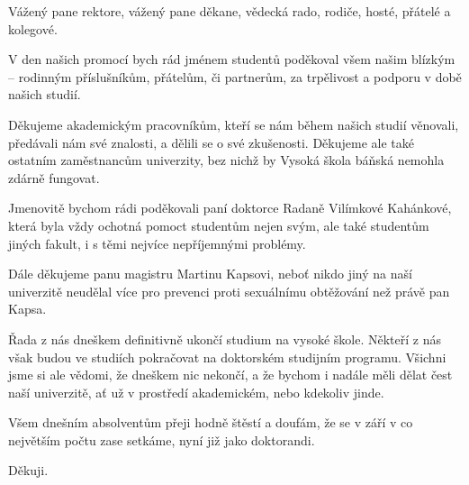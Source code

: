 \documentclass[14pt]{article}
\begin{document}
Vážený pane rektore, vážený pane děkane, vědecká rado, rodiče, hosté, přátelé a kolegové.

V den našich promocí bych rád jménem studentů poděkoval všem našim blízkým -- rodinným
příslušníkům, přátelům, či partnerům, za trpělivost a podporu v době našich studií.

Děkujeme akademickým pracovníkům, kteří se nám během našich studií věnovali, předávali nám své
znalosti, a dělili se o své zkušenosti. Děkujeme ale také ostatním zaměstnancům univerzity, bez
nichž by Vysoká škola báňská nemohla zdárně fungovat.

Jmenovitě bychom rádi poděkovali paní doktorce Radaně Vilímkové Kahánkové, která byla vždy ochotná
pomoct studentům nejen svým, ale také studentům jiných fakult, i s těmi nejvíce nepříjemnými
problémy.

Dále děkujeme panu magistru Martinu Kapsovi, neboť nikdo jiný na naší univerzitě neudělal více pro
prevenci proti sexuálnímu obtěžování než právě pan Kapsa.

Řada z nás dneškem definitivně ukončí studium na vysoké škole. Někteří z nás však budou ve studiích
pokračovat na doktorském studijním programu. Všichni jsme si ale vědomi, že dneškem nic nekončí,
a že bychom i nadále měli dělat čest naší univerzitě, ať už v prostředí akademickém, nebo kdekoliv
jinde.

Všem dnešním absolventům přeji hodně štěstí a doufám, že se v září v co největším počtu zase
setkáme, nyní již jako doktorandi.

Děkuji.
\end{document}
